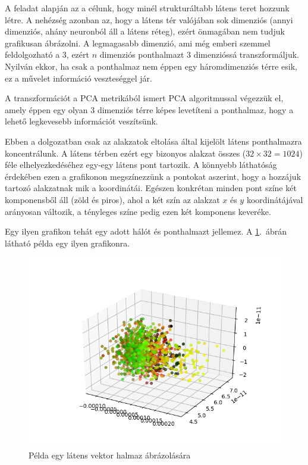 A feladat alapján az a célunk, hogy minél strukturáltabb látens teret hozzunk létre. A nehézség azonban az, hogy a látens tér valójában sok dimenziós (annyi dimenziós, ahány neuronból áll a látens réteg), ezért önmagában nem tudjuk grafikusan ábrázolni. A legmagasabb dimenzió, ami még emberi szemmel feldolgozható a $3$, ezért $n$ dimenziós ponthalmazt $3$ dimenzióssá transzformáljuk. Nyilván ekkor, ha csak a ponthalmaz nem éppen egy háromdimenziós térre esik, ez a művelet információ veszteséggel jár.

A transzformációt a PCA metrikából ismert PCA algoritmussal végezzük el, amely éppen egy olyan $3$ dimenziós térre képes levetíteni a ponthalmaz, hogy a lehető legkevesebb információt veszítsünk.

Ebben a dolgozatban csak az alakzatok eltolása által kijelölt látens ponthalmazra koncentrálunk. A látens térben ezért egy bizonyos alakzat összes ($32\times32=1024$) féle elhelyezkedéséhez egy-egy látens pont tartozik. A könnyebb láthatóság érdekében ezen a grafikonon megszínezzünk a pontokat aszerint, hogy a hozzájuk tartozó alakzatnak mik a koordinátái. Egészen konkrétan minden pont színe két komponensből áll (zöld és piros), ahol a két szín az alakzat $x$ és $y$ koordinátájával arányosan változik, a tényleges színe pedig ezen két komponens keveréke. 

Egy ilyen grafikon tehát egy adott hálót és ponthalmazt jellemez. A \ref{m3D}.~ábrán látható példa egy ilyen grafikonra.

\begin{figure}[h!]
\begin{center} 
	\begin{center}
	\includegraphics[width=1\linewidth]{3D-example.png}
	\end{center}
	
  \caption{Példa egy látens vektor halmaz ábrázolására}\label{m3D}
\end{center}
\end{figure}

